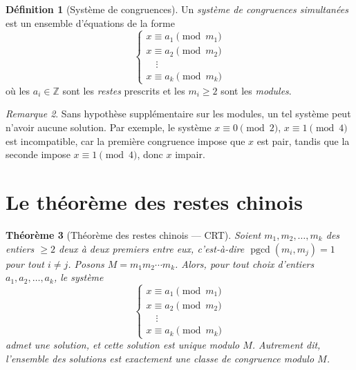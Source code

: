 \documentclass[12pt,a4paper,openany]{book}
\theoremstyle{definition}
\newtheorem{definition}{Définition}[chapter]
\theoremstyle{plain}
\newtheorem{theoreme}[definition]{Théorème}
\theoremstyle{remark}
\newtheorem{remarque}[definition]{Remarque}
\newcommand{\Z}{\mathbb{Z}}
\DeclareMathOperator{\pgcd}{pgcd}
\begin{document}
\begin{definition}[Système de congruences]
\label{def:systeme-congruences}
Un \emph{système de congruences simultanées} est un ensemble d'équations
de la forme
\[
  \begin{cases}
    x \equiv a_1 \pmod{m_1} \\
    x \equiv a_2 \pmod{m_2} \\
    \quad \vdots \\
    x \equiv a_k \pmod{m_k}
  \end{cases}
\]
où les $a_i \in \Z$ sont les \emph{restes} prescrits et les $m_i \geq 2$
sont les \emph{modules}.
\end{definition}

\begin{remarque}
Sans hypothèse supplémentaire sur les modules, un tel système peut n'avoir
aucune solution. Par exemple, le système $x \equiv 0 \pmod{2}$,
$x \equiv 1 \pmod{4}$ est incompatible, car la première congruence impose
que $x$ est pair, tandis que la seconde impose $x \equiv 1 \pmod{4}$,
donc $x$ impair.
\end{remarque}

\section{Le théorème des restes chinois}
\label{sec:crt:enonce}

\begin{theoreme}[Théorème des restes chinois --- CRT]
\label{thm:crt}
Soient $m_1, m_2, \ldots, m_k$ des entiers $\geq 2$ deux à deux premiers
entre eux, c'est-à-dire $\pgcd(m_i, m_j) = 1$ pour tout $i \neq j$.
Posons $M = m_1 m_2 \cdots m_k$. Alors, pour tout choix d'entiers
$a_1, a_2, \ldots, a_k$, le système
\[
  \begin{cases}
    x \equiv a_1 \pmod{m_1} \\
    x \equiv a_2 \pmod{m_2} \\
    \quad \vdots \\
    x \equiv a_k \pmod{m_k}
  \end{cases}
\]
admet une solution, et cette solution est \emph{unique modulo $M$}.
Autrement dit, l'ensemble des solutions est exactement une classe de
congruence modulo $M$.
\end{theoreme}
\end{document}
